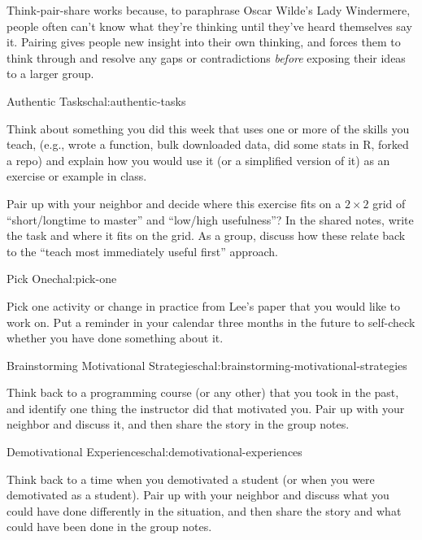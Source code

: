 Think-pair-share works because, to paraphrase Oscar Wilde's Lady
Windermere, people often can't know what they're thinking until
they've heard themselves say it.  Pairing gives people new insight
into their own thinking, and forces them to think through and resolve
any gaps or contradictions \emph{before} exposing their ideas to a
larger group.


\begin{challenge}{Authentic Tasks}{chal:authentic-tasks}

Think about something you did this week that uses one or more of the
skills you teach, (e.g., wrote a function, bulk downloaded data, did
some stats in R, forked a repo) and explain how you would use it (or a
simplified version of it) as an exercise or example in class.

Pair up with your neighbor and decide where this exercise fits on a
$2{\times}2$ grid of ``short/longtime to master'' and ``low/high
usefulness''?  In the shared notes, write the task and where it fits
on the grid. As a group, discuss how these relate back to the ``teach
most immediately useful first'' approach.

\end{challenge}

\begin{challenge}{Pick One}{chal:pick-one}

Pick one activity or change in practice from Lee's paper
\cite{bib:lee-create-inclusive-community} that you would like to work
on.  Put a reminder in your calendar three months in the future to
self-check whether you have done something about it.

\end{challenge}

\begin{challenge}{Brainstorming Motivational Strategies}{chal:brainstorming-motivational-strategies}

Think back to a programming course (or any other) that you took in the
past, and identify one thing the instructor did that motivated you.
Pair up with your neighbor and discuss it, and then share the story in
the group notes.

\end{challenge}

\begin{challenge}{Demotivational Experiences}{chal:demotivational-experiences}

Think back to a time when you demotivated a student (or when you were
demotivated as a student). Pair up with your neighbor and discuss what
you could have done differently in the situation, and then share the
story and what could have been done in the group notes.

\end{challenge}

